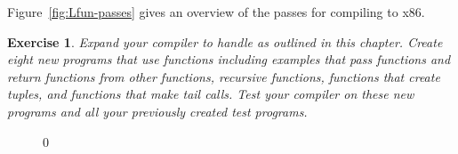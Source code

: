 \documentclass[7x10]{TimesAPriori_MIT}%
\def\racketEd{0}
\providecommand{\BookEdition}{1}
\let\edition\BookEdition
\newtheorem{exercise}[theorem]{Exercise}
\numberwithin{theorem}{chapter}
\numberwithin{definition}{chapter}
\numberwithin{equation}{chapter}
\begin{document}
Figure~\ref{fig:Lfun-passes} gives an overview of the passes for
compiling \LangFun{} to x86.

\begin{exercise}\normalfont\normalsize
Expand your compiler to handle \LangFun{} as outlined in this chapter.
Create eight new programs that use functions including examples that
pass functions and return functions from other functions, recursive
functions, functions that create tuples, and functions that make tail
calls. Test your compiler on these new programs and all your
previously created test programs.
\end{exercise}


\begin{figure}[tbp]
  \begin{tcolorbox}[colback=white]
{\if\edition\racketEd    
    }
\end{tcolorbox}
\end{figure}
\end{document}
